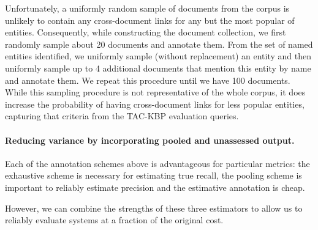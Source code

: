 Unfortunately, a uniformly random sample of documents from the corpus is unlikely to contain any cross-document links for any but the most popular of entities.
Consequently, while constructing the document collection, we first randomly sample about 20 documents and annotate them.
From the set of named entities identified, we uniformly sample (without replacement) an entity and then uniformly sample up to 4 additional documents that mention this entity by name and annotate them.
We repeat this procedure until we have 100 documents.
While this sampling procedure is not representative of the whole corpus, it does increase the probability of having cross-document links for less popular entities, capturing that criteria from the TAC-KBP evaluation queries.

\paragraph{Reducing variance by incorporating pooled and unassessed output.}

%

Each of the annotation schemes above is advantageous for particular metrics: the exhaustive scheme is necessary for estimating true recall, the pooling scheme is important to reliably estimate precision and the estimative annotation is cheap.

However, we can combine the strengths of these three estimators to allow us to reliably evaluate systems at a fraction of the original cost.

